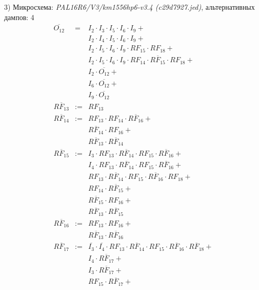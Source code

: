 \documentclass[a4paper,russian]{report}
\begin{document}
3) Микросхема: \emph{PAL16R6/V3/km1556hp6-v3.4  (c29d7927.jed)}, альтернативных дампов: 4
\nopagebreak\begin{eqnarray*}
    \overline{O_{12}} & = & I_{2} \cdotp I_{3} \cdotp I_{5} \cdotp I_{6} \cdotp I_{9} + \\
	& &  I_{2} \cdotp I_{4} \cdotp I_{5} \cdotp I_{6} \cdotp I_{9} + \\
	& &  I_{2} \cdotp I_{5} \cdotp I_{6} \cdotp I_{9} \cdotp RF_{15} \cdotp RF_{18} + \\
	& &  I_{2} \cdotp I_{5} \cdotp I_{6} \cdotp I_{9} \cdotp RF_{14} \cdotp \overline{RF_{15}} \cdotp RF_{18} + \\
	& &  I_{2} \cdotp \overline{O_{12}} + \\
	& &  I_{6} \cdotp \overline{O_{12}} + \\
	& &  I_{9} \cdotp \overline{O_{12}} \\
    \overline{RF_{13}} & := & RF_{13} \\
    \overline{RF_{14}} & := & RF_{13} \cdotp RF_{14} \cdotp \overline{RF_{16}} + \\
	& &  \overline{RF_{14}} \cdotp RF_{16} + \\
	& &  \overline{RF_{13}} \cdotp \overline{RF_{14}} \\
    \overline{RF_{15}} & := & I_{3} \cdotp RF_{13} \cdotp \overline{RF_{14}} \cdotp RF_{15} \cdotp \overline{RF_{16}} + \\
	& &  I_{4} \cdotp RF_{13} \cdotp \overline{RF_{14}} \cdotp RF_{15} \cdotp \overline{RF_{16}} + \\
	& &  RF_{13} \cdotp \overline{RF_{14}} \cdotp RF_{15} \cdotp \overline{RF_{16}} \cdotp RF_{18} + \\
	& &  RF_{14} \cdotp \overline{RF_{15}} + \\
	& &  \overline{RF_{15}} \cdotp RF_{16} + \\
	& &  \overline{RF_{13}} \cdotp \overline{RF_{15}} \\
    \overline{RF_{16}} & := & RF_{13} \cdotp RF_{16} + \\
	& &  \overline{RF_{13}} \cdotp \overline{RF_{16}} \\
    \overline{RF_{17}} & := & \overline{I_{3}} \cdotp \overline{I_{4}} \cdotp RF_{13} \cdotp \overline{RF_{14}} \cdotp RF_{15} \cdotp \overline{RF_{16}} \cdotp \overline{RF_{18}} + \\
	& &  I_{4} \cdotp \overline{RF_{17}} + \\
	& &  I_{3} \cdotp \overline{RF_{17}} + \\
	& &  RF_{15} \cdotp \overline{RF_{17}} + \\

\end{eqnarray*}
\end{document}
